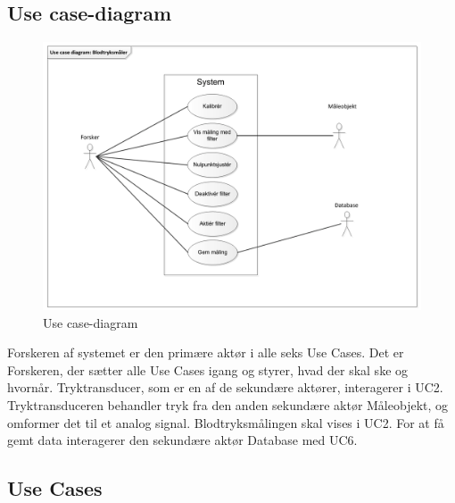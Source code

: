 \subsection{Use case-diagram}
\begin{figure}[H]
	\centering
	\includegraphics[width=1\textwidth]{Figurer/Snip20151027_49}
	\caption{Use case-diagram}
	\label{fig:Use case-diagram}
\end{figure}

Forskeren af systemet er den primære aktør i alle seks Use Cases. Det er Forskeren, der sætter alle Use Cases igang og styrer, hvad der skal ske og hvornår. Tryktransducer, som er en af de sekundære aktører, interagerer i UC2. Tryktransduceren behandler tryk fra den anden sekundære aktør Måleobjekt, og omformer det til et analog signal. Blodtryksmålingen skal vises i UC2. For at få gemt data interagerer den sekundære aktør Database med UC6.  

\subsection{Use Cases}

